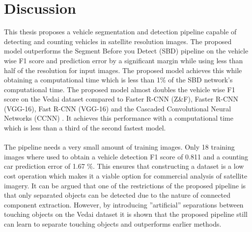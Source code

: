 \documentclass{kththesis}
\begin{document}
\chapter{Discussion}
This thesis proposes a vehicle segmentation and detection pipeline capable of detecting and counting vehicles in satellite resolution images. The proposed model outperforms the Segment Before you Detect (SBD) pipeline \parencite{audebert_usability_2016} on the vehicle wise F1 score and prediction error by a significant margin while using less than half of the resolution for input images. The proposed model achieves this while obtaining a computational time which is less than 1\% of the SBD network's computational time. The proposed model almost doubles the vehicle wise F1 score on the Vedai dataset compared to Faster R-CNN (Z\&F), Faster R-CNN (VGG-16), Fast R-CNN (VGG-16) \parencite{zeiler_visualizing_2014} and the Cascaded Convolutional Neural Networks (CCNN) \parencite{zhong_robust_2017-1}. It achieves this performance with a computational time which is less than a third of the second fastest model.\\
\\
The pipeline needs a very small amount of training images. Only 18 training images where used to obtain a vehicle detection F1 score of 0.811 and a counting car prediction error of 1.67 \%. This  ensures that constructing a dataset is a low cost operation which makes it a viable option for commercial analysis of satellite imagery. It can be argued that one of the restrictions of the proposed pipeline is that only separated objects can be detected due to the nature of connected component extraction. However, by introducing ''artificial'' separations between touching objects on the Vedai dataset it is shown that the proposed pipeline still can learn to separate touching objects and outperforms earlier methods.
\printbibliography[heading=bibintoc] %

\appendix
%
\end{document}
